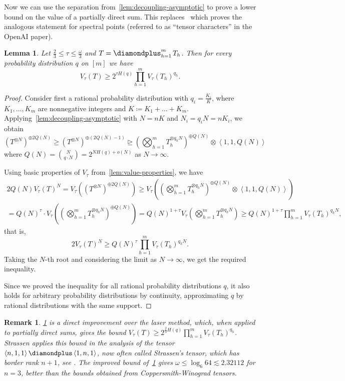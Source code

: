 \documentclass[11pt,letterpaper]{article}
\newtheorem{lemma}[theorem]{Lemma}\AddToHook{env/lemma/begin}{\crefalias{theorem}{lemma}}
\newtheorem{remark}[theorem]{Remark}\AddToHook{env/remark/begin}{\crefalias{theorem}{remark}}
\numberwithin{equation}{section}
\DeclareMathOperator*{\bigdiamondplus}{\scalerel*{\diamondplus}{\bigoplus}}
\begin{document}
Now we can use the separation from~\cref{lem:decoupling-asymptotic} to prove a lower bound on the value of a partially direct sum.
This replaces~\cite[Corollary~3.2]{chatgpt-paper} which proves the analogous statement for spectral points (referred to as
``tensor characters'' in the OpenAI paper).

\begin{lemma}\label{lem:diamondsum-value-prob}
  Let $\frac23\leq \tau \leq \frac{\omega}{3}$ and $T = \bigdiamondplus_{h = 1}^{m} T_h$.
  Then for every probability distribution $q$ on $[m]$ we have \[V_\tau(T) \geq 2^{\tau H(q)} \prod_{h = 1}^{m} V_\tau(T_h)^{q_h}.\]
\end{lemma}
\begin{proof}
    Consider first a rational probability distribution with $q_i = \frac{K_i}{K}$, where $K_1,\dots,K_m$ are nonnegative integers and $K\coloneqq K_1+\dots+K_m$.
    Applying~\cref{lem:decoupling-asymptotic} with $N = nK$ and $N_i = q_i N = nK_i$, we obtain
    \[ (T^{\otimes N})^{\oplus 2Q(N)} \geq (T^{\otimes N})^{\oplus (2Q(N) - 1)} \trianglerighteq (\bigotimes_{h = 1}^{m} T_h^{\otimes q_h N})^{\oplus Q(N)} \otimes \left<1,1,Q(N)\right>\] where $Q(N) = \binom{N}{q\cdot N} = 2^{N H(q) + o(N)}$ as $N \to \infty$.

    Using basic properties of $V_\tau$ from~\cref{lem:value-properties}, we have
    \begin{multline*}
    2Q(N) V_\tau(T)^N = V_\tau((T^{\otimes N})^{\oplus 2Q(N)}) \geq V_\tau((\bigotimes_{h = 1}^{m} T_h^{\otimes q_h
    N})^{\oplus Q(N)} \otimes \left<1,1,Q(N)\right>) \\= Q(N)^\tau \cdot V_\tau((\bigotimes_{h = 1}^{m}
    T_h^{\otimes q_h N})^{\oplus Q(N)}) = Q(N)^{1 + \tau} V_\tau(\bigotimes_{h = 1}^{m} T_h^{\otimes q_h N}) \geq Q(N)^{1 + \tau} \prod_{h = 1}^{m} V_\tau(T_h)^{q_h N},
    \end{multline*}
    that is,
    \[2 V_\tau(T)^N \geq Q(N)^\tau \prod_{h = 1}^{m} V_\tau(T_h)^{q_h N}.\]
    Taking the $N$-th root and considering the limit as $N \to \infty$, we get the required inequality.

    Since we proved the inequality for all rational probability distributions $q$, it also holds for arbitrary probability distributions by continuity, approximating $q$ by rational distributions with the same support.
\end{proof}

\begin{remark}\label{rem:laser-comparison}
  \cref{lem:diamondsum-value-prob} is a direct improvement over the laser method, which, when applied to partially direct sums, gives the bound $V_\tau(T) \geq 2^{\frac23 H(q)} \prod_{h = 1}^{m} V_\tau(T_h)^{q_h}$.
  Strassen applies this bound in the analysis of the tensor $\left<n, 1, 1\right> \diamondplus \left<1, n, 1\right>$, now often called Strassen's tensor, which has border rank $n + 1$, see \cite[Lemma~7.4]{Strassen-87}.
  The improved bound of~\cref{lem:diamondsum-value-prob} gives $\omega \leq \log_6 64 \lesssim 2.32112$ for $n = 3$, better than the bounds obtained from Coppersmith-Winograd tensors.
\end{remark}
\end{document}
